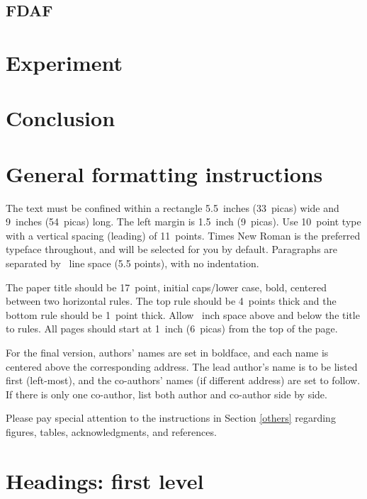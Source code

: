 \documentclass{article}
\begin{document}


\subsection{FDAF}




\section{Experiment}




\section{Conclusion}




\section{General formatting instructions}
\label{gen_inst}


The text must be confined within a rectangle 5.5~inches (33~picas) wide and
9~inches (54~picas) long. The left margin is 1.5~inch (9~picas).  Use 10~point
type with a vertical spacing (leading) of 11~points.  Times New Roman is the
preferred typeface throughout, and will be selected for you by default.
Paragraphs are separated by ~line space (5.5 points), with no
indentation.


The paper title should be 17~point, initial caps/lower case, bold, centered
between two horizontal rules. The top rule should be 4~points thick and the
bottom rule should be 1~point thick. Allow ~inch space above and
below the title to rules. All pages should start at 1~inch (6~picas) from the
top of the page.


For the final version, authors' names are set in boldface, and each name is
centered above the corresponding address. The lead author's name is to be listed
first (left-most), and the co-authors' names (if different address) are set to
follow. If there is only one co-author, list both author and co-author side by
side.


Please pay special attention to the instructions in Section \ref{others}
regarding figures, tables, acknowledgments, and references.


\section{Headings: first level}
\label{headings}
\end{document}
